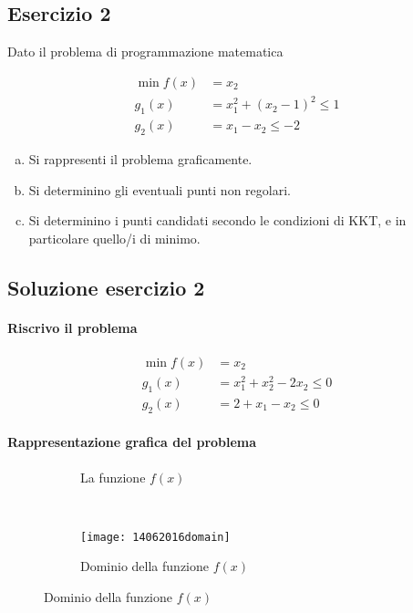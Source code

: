 \documentclass[\main/main.tex]{subfiles}
\begin{document}
\subsection{Esercizio 2}
Dato il problema di programmazione matematica

\begin{align*}
  \min f(x) & =x_2                       \\
  g_1(x)    & = x_1^2 + (x_2-1)^2 \leq 1 \\
  g_2(x)    & = x_1 - x_2 \leq -2
\end{align*}

\begin{enumerate}[a)]
  \item Si rappresenti il problema graficamente.
  \item Si determinino gli eventuali punti non regolari.
  \item Si determinino i punti candidati secondo le condizioni di KKT, e in particolare quello/i di minimo.
\end{enumerate}

\subsection{Soluzione esercizio 2}

\paragraph*{Riscrivo il problema}

\begin{align*}
  \min f(x) & =x_2                         \\
  g_1(x)    & = x_1^2 + x^2_2 -2x_2 \leq 0 \\
  g_2(x)    & = 2 + x_1 - x_2 \leq 0
\end{align*}

\paragraph*{Rappresentazione grafica del problema}

\begin{figure}
  \begin{subfigure}{0.45\textwidth}
    \caption{La funzione $f(x)$}
    \label{func_1}
  \end{subfigure}
  ~
  \begin{subfigure}{0.45\textwidth}
    \texttt{[image: 14062016domain]}
    \caption{Dominio della funzione $f(x)$}
  \end{subfigure}
\end{figure}
\end{document}
